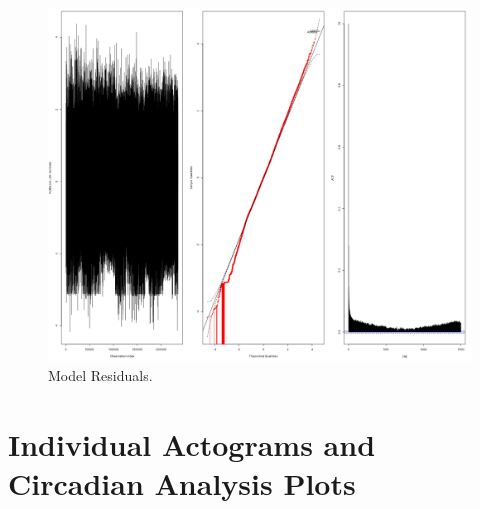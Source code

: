 \documentclass[msc,numbers,hidelinks]{coppe}
\begin{document}
  \begin{figure}

  {\centering \includegraphics[width=1\linewidth]{../04_figures/residuals/m2_PR} 

  }

  \caption{Model Residuals.}\label{fig:appendix-residuals}
  \end{figure}
  \hypertarget{individual-actograms-and-circadian-analysis-plots}{%
  \chapter{Individual Actograms and Circadian Analysis Plots}\label{individual-actograms-and-circadian-analysis-plots}}
\end{document}
